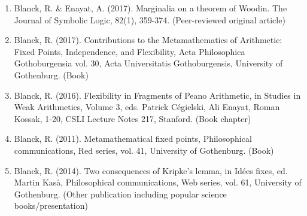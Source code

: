 \documentclass{article}
\begin{document}
\begin{enumerate}

\item Blanck, R. \& Enayat, A. (2017). Marginalia on a theorem of Woodin. The Journal of Symbolic Logic, 82(1), 359-374.  (Peer-reviewed original article)


\item Blanck, R. (2017). Contributions to the Metamathematics of Arithmetic: Fixed Points, Independence, and Flexibility, Acta Philosophica Gothoburgensia vol. 30, Acta Universitatis Gothoburgensis, University of Gothenburg. (Book)


\item Blanck, R. (2016). Flexibility in Fragments of Peano Arithmetic, in Studies in Weak Arithmetics, Volume 3, eds. Patrick Cégielski, Ali Enayat, Roman Kossak, 1-20, CSLI Lecture Notes 217, Stanford. (Book chapter)

\item Blanck, R. (2011). Metamathematical fixed points, Philosophical communications, Red series, vol. 41, University of Gothenburg. (Book)



\item Blanck, R. (2014). Two consequences of Kripke’s lemma, in Idées fixes, ed. Martin Kaså, Philosophical communications, Web series, vol. 61, University of Gothenburg. (Other publication including popular science books/presentation)
\end{enumerate}
\end{document}
